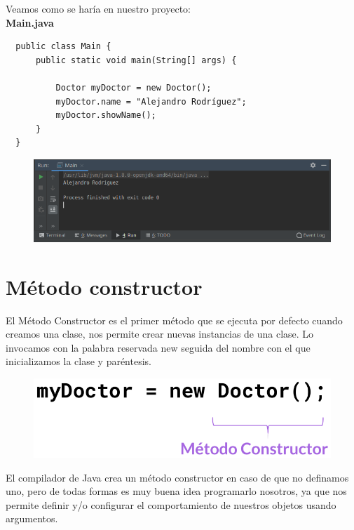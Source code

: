 \documentclass{article}
\begin{document}
Veamos como se haría en nuestro proyecto:\\

\textbf{Main.java}
\begin{verbatim}
  public class Main {
      public static void main(String[] args) {

          Doctor myDoctor = new Doctor();
          myDoctor.name = "Alejandro Rodríguez";
          myDoctor.showName();
      }
  }
\end{verbatim}

\begin{figure}[h!]
  \centering
  \includegraphics[scale=0.75]{./Pictures/013_primer_objeto.png}
\end{figure}


\section{Método constructor}%
El Método Constructor es el primer método que se ejecuta por defecto cuando
creamos una clase, nos permite crear nuevas instancias de una clase. Lo
invocamos con la palabra reservada new seguida del nombre con el que
inicializamos la clase y paréntesis.\\

\begin{figure}[h!]
  \centering
  \includegraphics[scale=0.35]{./Pictures/012_met_constructor.png}
\end{figure}

El compilador de Java crea un método constructor en caso de que no definamos
uno, pero de todas formas es muy buena idea programarlo nosotros, ya que nos
permite definir y/o configurar el comportamiento de nuestros objetos usando
argumentos.\\
\end{document}
